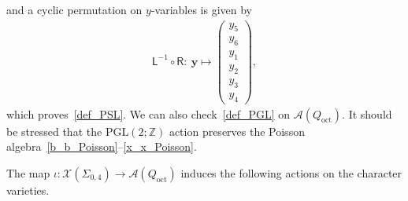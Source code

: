 \documentclass[pdftex]{sigma}
\numberwithin{equation}{section}
\begin{document}
 and a cyclic permutation on $y$-variables is given by
 \begin{gather*}
 \mathsf{L}^{-1} \circ \mathsf{R}\colon \
 \boldsymbol{y} \mapsto
 \left( \begin{matrix}
 y_5 \\ y_6 \\ y_1 \\ y_2 \\ y_3 \\ y_4
 \end{matrix} \right) ,
 \end{gather*}
 which proves~\eqref{def_PSL}. We can also check~\eqref{def_PGL} on $\mathcal{A}(Q_{\text{oct}})$. It should be stressed that the $\mathrm{PGL}(2;\mathbb{Z})$ action preserves the Poisson algebra~\eqref{b_b_Poisson}--\eqref{x_x_Poisson}.

The map $\iota\colon \mathcal{X}(\Sigma_{0,4}) \to\mathcal{A}(Q_{\text{oct}})$ induces the following actions on the character varieties.
\end{document}
